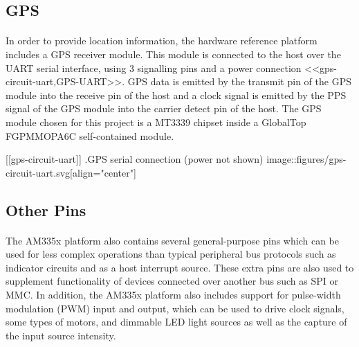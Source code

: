 \subsection{GPS}

\paragraph{}
In order to provide location information, the hardware reference platform includes a GPS receiver module.
This module is connected to the host over the UART serial interface, using 3 signalling pins and a power connection <<gps-circuit-uart,GPS-UART>>.
GPS data is emitted by the transmit pin of the GPS module into the receive pin of the host and a clock signal is emitted by the PPS signal of the GPS module into the carrier detect pin of the host.
The GPS module chosen for this project is a MT3339 chipset inside a GlobalTop FGPMMOPA6C self-contained module.

[[gps-circuit-uart]]
.GPS serial connection (power not shown)
image::figures/gps-circuit-uart.svg[align="center"]

\subsection{Other Pins}

\paragraph{}
The AM335x platform also contains several general-purpose pins which can be used for less complex operations than typical peripheral bus protocols such as indicator circuits and as a host interrupt source.
These extra pins are also used to supplement functionality of devices connected over another bus such as SPI or MMC.
In addition, the AM335x platform also includes support for pulse-width modulation (PWM) input and output, which can be used to drive clock signals, some types of motors, and dimmable LED light sources as well as the capture of the input source intensity.
